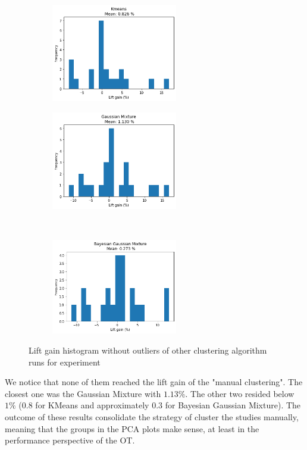 \begin{figure}[!ht]
    \begin{subfigure}{.5\linewidth}
        \centering
        \includegraphics[width=5.5cm]{fig/ch4-kmeans_lift_gain_hist.png}
        \caption{}
        \label{fig:other-cluster-algo:kmeans}
    \end{subfigure}
    \begin{subfigure}{.5\linewidth}
        \centering
        \includegraphics[width=5.5cm]{fig/ch4-gmm_lift_gain_hist.png}
        \caption{}
        \label{fig:other-cluster-algo:gmm}
    \end{subfigure}\\[1ex]
    \begin{subfigure}{\linewidth}
        \centering
        \includegraphics[width=5.5cm]{fig/ch4-bgm_lift_gain_hist.png}
        \caption{}
        \label{fig:other-cluster-algo:bgm}
    \end{subfigure}
    \caption{Lift gain histogram without outliers of other clustering algorithm runs for experiment \nameExperimentII{}}
    \label{fig:other-cluster-algo}
\end{figure}

We notice that none of them reached the lift gain of the "manual clustering". The closest one was the Gaussian Mixture with $1.13\%$. The other two resided below $1\%$ ($0.8$ for KMeans and approximately $0.3$ for Bayesian Gaussian Mixture). The outcome of these results consolidate the strategy of cluster the studies manually, meaning that the groups in the PCA plots make sense, at least in the performance perspective of the OT. 

